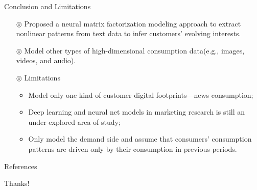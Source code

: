 \documentclass{beamer}
\begin{document}
\begin{frame}{Conclusion and Limitations}
	\begin{itemize}
		\item[$\circledcirc$] Proposed a neural matrix factorization modeling approach to extract nonlinear patterns from text data to infer customers' evolving interests.
		\item[$\circledcirc$] Model other types of high-dimensional consumption data(e.g., images, videos, and audio).
		\item[$\circledcirc$] Limitations
		      \begin{itemize}
			      \item Model only one kind of customer digital footprints—news consumption;
			      \item Deep learning and neural net models in marketing research is still an under explored area of study;
			      \item Only model the demand side and assume that consumers' consumption patterns are driven only by their consumption in previous periods.
		      \end{itemize}
	\end{itemize}
\end{frame}


\begin{frame}[allowframebreaks]{References}
	
	
\end{frame}

\begin{frame}
	\begin{center}
		{\Huge\calligra Thanks!}
	\end{center}
\end{frame}
\end{document}
